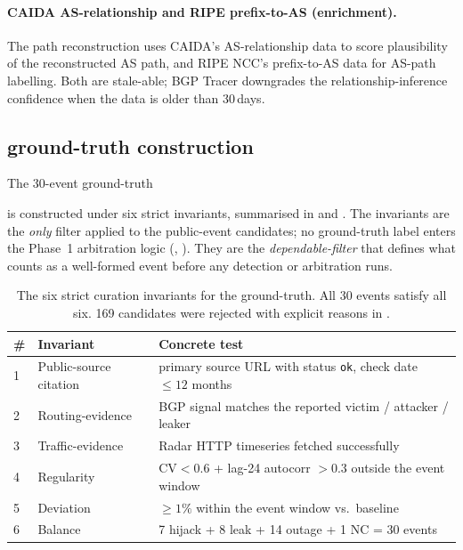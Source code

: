\paragraph{CAIDA AS-relationship and RIPE prefix-to-AS
(enrichment).} The \ctpr{} path reconstruction uses
CAIDA's AS-relationship data \cite{caida-asrel} to score
plausibility of the reconstructed AS path, and RIPE NCC's
prefix-to-AS data for AS-path labelling. Both are
stale-able; BGP Tracer downgrades the relationship-inference
confidence when the data is older than 30\,days.

\subsection{ground-truth construction}
\label{sec:dataset-invariants}

The 30-event ground-truth

is constructed under six strict invariants, summarised in
 and . The
invariants are the \emph{only} filter applied to the
public-event candidates; no ground-truth label enters the
Phase~1 arbitration logic (,
).
They are the \emph{dependable-filter} that defines what
counts as a well-formed event before any detection or
arbitration runs.

\begin{table}[h]
\centering
\setlength{\tabcolsep}{3pt}
\small
\begin{tabular}{p{}p{}p{}}
\hline
\# & Invariant & Concrete test \\ \hline
1 & Public-source citation & primary source URL with status \texttt{ok}, check date $\leq 12$ months \\
2 & Routing-evidence & \rrc{} BGP signal matches the reported victim / attacker / leaker \\
3 & Traffic-evidence & \cf{} Radar HTTP timeseries fetched successfully \\
4 & Regularity & $\mathrm{CV}<0.6$ + lag-24 autocorr $>0.3$ outside the event window \\
5 & Deviation & $\geq 1\%$ within the event window vs.\ baseline \\
6 & Balance & 7 hijack + 8 leak + 14 outage + 1 NC = 30 events \\
\hline
\end{tabular}
\caption{The six strict curation invariants for the
ground-truth. All 30 events satisfy all six. 169
candidates were rejected with explicit reasons in
\protect.}
\label{tab:invariants}
\end{table}


